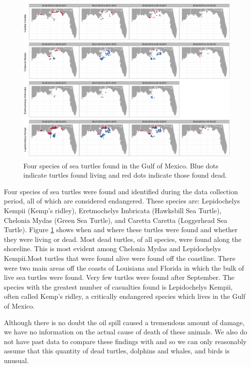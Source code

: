 \documentclass[11pt]{article}
\begin{document}
\begin{figure}[htbp] %
   \centering
   \includegraphics[width=6in]{turtles.png} 
   \caption{Four species of sea turtles found in the Gulf of Mexico.  Blue dots indicate turtles found living and red dots indicate those found dead.}
   \label{turtles}
\end{figure}

Four species of sea turtles were found and identified during the data collection period, all of which are considered endangered.  These species are: Lepidochelys Kempii (Kemp's ridley), Eretmochelys Imbricata (Hawksbill Sea Turtle), Chelonia Mydas (Green Sea Turtle), and Caretta Caretta (Loggerhead Sea Turtle). Figure \ref{turtles} shows when and where these turtles were found and whether they were living or dead. Most dead turtles, of all species, were found along the shoreline. This is most evident among Chelonia Mydas and Lepidochelys Kempii.Most turtles that were found alive were found off the coastline.  There were two main areas off the coasts of Louisiana and Florida in which the bulk of live sea turtles were found. Very few turtles were found after September. The species with the greatest number of casualties found is Lepidochelys Kempii, often called Kemp's ridley, a critically endangered species which lives in the Gulf of Mexico. 

Although there is no doubt the oil spill caused a tremendous amount of damage, we have no information on the actual cause of death of these animals.  We also do not have past data to compare these findings with and so we can only reasonably assume that this quantity of dead turtles, dolphins and whales, and birds is unusual.  
\end{document}
